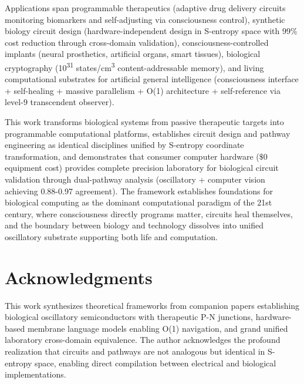 \documentclass[11pt,a4paper]{article}
\begin{document}
Applications span programmable therapeutics (adaptive drug delivery circuits monitoring biomarkers and self-adjusting via consciousness control), synthetic biology circuit design (hardware-independent design in S-entropy space with 99\% cost reduction through cross-domain validation), consciousness-controlled implants (neural prosthetics, artificial organs, smart tissues), biological cryptography (10\textsuperscript{31} states/cm\textsuperscript{3} content-addressable memory), and living computational substrates for artificial general intelligence (consciousness interface + self-healing + massive parallelism + O(1) architecture + self-reference via level-9 transcendent observer).

This work transforms biological systems from passive therapeutic targets into programmable computational platforms, establishes circuit design and pathway engineering as identical disciplines unified by S-entropy coordinate transformation, and demonstrates that consumer computer hardware ($\$0$ equipment cost) provides complete precision laboratory for biological circuit validation through dual-pathway analysis (oscillatory + computer vision achieving 0.88-0.97 agreement). The framework establishes foundations for biological computing as the dominant computational paradigm of the 21st century, where consciousness directly programs matter, circuits heal themselves, and the boundary between biology and technology dissolves into unified oscillatory substrate supporting both life and computation.

\section*{Acknowledgments}

This work synthesizes theoretical frameworks from companion papers establishing biological oscillatory semiconductors with therapeutic P-N junctions, hardware-based membrane language models enabling O(1) navigation, and grand unified laboratory cross-domain equivalence. The author acknowledges the profound realization that circuits and pathways are not analogous but identical in S-entropy space, enabling direct compilation between electrical and biological implementations.
\end{document}
